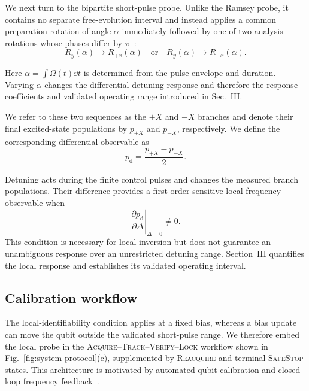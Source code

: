 We next turn to the bipartite short-pulse probe. Unlike the Ramsey probe,
it contains no separate free-evolution interval and instead applies a common
preparation rotation of angle $\alpha$ immediately
followed by one of two analysis rotations whose phases differ by $\pi$~\cite{herb2024quantum}:
\begin{equation}
    R_y(\alpha) \longrightarrow R_{+x}(\alpha) \quad\text{or}\quad R_y(\alpha) \longrightarrow R_{-x}(\alpha).
    \label{eq:bipartite-sequences}
\end{equation}

Here $\alpha = \int \Omega(t) \dd t$ is determined from the pulse envelope and duration. Varying $\alpha$ changes the differential detuning response and therefore the response coefficients and validated operating range introduced in Sec.~III.

We refer to these two sequences as the $+X$ and $-X$ branches and denote
their final excited-state populations by $p_{+X}$ and $p_{-X}$,
respectively. We define the corresponding differential observable as
\begin{equation}
    p_{\mathrm d}
    =
    \frac{p_{+X}-p_{-X}}{2}.
    \label{eq:pdiff}
\end{equation}

Detuning acts during the finite control pulses and changes the measured branch
populations. Their difference provides a first-order-sensitive local frequency
observable when
\begin{equation}
    \left.
    \frac{\partial p_{\mathrm d}}{\partial\Delta}
    \right|_{\Delta=0}
    \neq 0.
    \label{eq:local-identifiability}
\end{equation}
This condition is necessary for local inversion but does not guarantee an
unambiguous response over an unrestricted detuning range. Section~III
quantifies the local response and establishes its validated operating interval.


\subsection{Calibration workflow}
\label{sec:calibration-workflow}

The local-identifiability condition applies at a fixed bias, whereas a bias
update can move the qubit outside the validated short-pulse range. We therefore
embed the local probe in the
\textsc{Acquire--Track--Verify--Lock} workflow shown in
Fig.~\ref{fig:system-protocol}(c), supplemented by
\textsc{Reacquire} and terminal \textsc{SafeStop} states. This architecture is
motivated by automated qubit calibration and closed-loop frequency
feedback~\cite{kelly2018physical,wittler_integrated_2021,
vepsalainen2022improving}.

